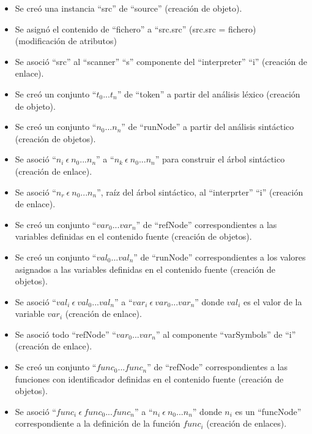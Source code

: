 \begin{framed}
\begin{description}
\begin {itemize}
      
         \item Se creó una instancia ``src'' de ``source'' (creación de objeto).
         \item Se asignó el contenido de ``fichero'' a ``src.src'' (src.src = fichero) (modificación de atributos)
         \item Se asoció ``src'' al ``scanner'' ``s'' componente del ``interpreter'' ``i'' (creación de enlace). 
         \item Se creó un conjunto ``$t_0...t_n$'' de ``token'' a partir del análisis léxico (creación de objeto).
         \item Se creó un conjunto ``$n_0...n_n$'' de ``runNode'' a partir del análisis sintáctico (creación de objetos).
         \item Se asoció ``$n_i\ \epsilon\ n_0...n_n$'' a ``$n_k\ \epsilon\ n_0...n_n$'' para construir el árbol sintáctico (creación de enlace).
         \item Se asoció  ``$n_r\ \epsilon\ n_0...n_n$'', raíz del árbol sintáctico, al ``interprter'' ``i'' (creación de enlace).
         \item Se creó un conjunto ``$var_0...var_n$'' de ``refNode'' correspondientes a las variables definidas en el contenido fuente (creación de objetos).
         \item Se creó un conjunto ``$val_0...val_n$'' de ``runNode'' correspondientes a los valores asignados a las variables definidas en el contenido fuente (creación de objetos).
         \item Se asoció ``$val_i\ \epsilon\ val_0...val_n$'' a  ``$var_i\ \epsilon\ var_0...var_n$'' donde $val_i$ es el valor de la variable $var_i$ (creación de enlace). 
         \item Se asoció todo ``refNode'' ``$var_0...var_n$'' al componente ``varSymbols'' de ``i'' (creación de enlace). 
         \item Se creó un conjunto ``$func_0...func_n$'' de ``refNode'' correspondientes a las funciones con identificador definidas en el contenido fuente (creación de objetos).
         \item Se asoció ``$func_i\ \epsilon\ func_0...func_n$'' a  ``$n_i\ \epsilon\ n_0...n_n$'' donde $n_i$ es un ``funcNode'' correspondiente a la definición de la función $func_i$ (creación de enlaces).

\end{itemize}
\end{description}
\end{framed}
